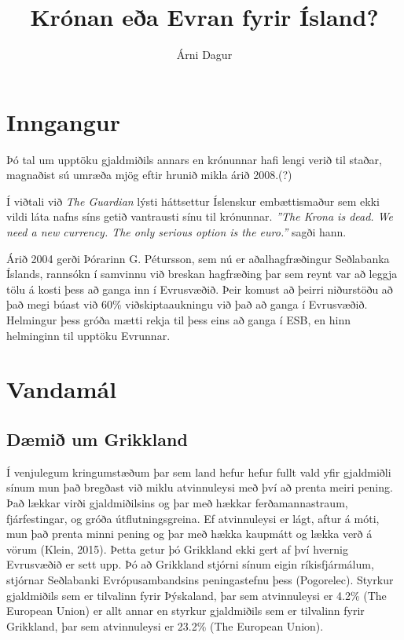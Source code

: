 \documentclass[a4paper]{article}
\title{Krónan eða Evran fyrir Ísland?}
\author{Árni Dagur}
\begin{document}
\maketitle

\section{Inngangur}

Þó tal um upptöku gjaldmiðils annars en krónunnar hafi lengi verið til staðar, magnaðist sú umræða mjög eftir hrunið mikla árið 2008.(?)

Í viðtali við \textit{The Guardian} lýsti háttsettur Íslenskur embættismaður sem ekki vildi láta nafns síns getið vantrausti sínu til krónunnar. \textit{''The Krona is dead. We need a new currency. The only serious option is the euro.''} sagði hann.\cite{traynor_2009}

Árið 2004 gerði Þórarinn G. Pétursson, sem nú er aðalhagfræðingur Seðlabanka Íslands, rannsókn í samvinnu við breskan hagfræðing þar sem reynt var að leggja tölu á kosti þess að ganga inn í Evrusvæðið. Þeir komust að þeirri niðurstöðu að það megi búast við 60\% viðskiptaaukningu við það að ganga í Evrusvæðið. Helmingur þess gróða mætti rekja til þess eins að ganga í ESB, en hinn helminginn til upptöku Evrunnar.\cite{icb_wp_26}

\section{Vandamál}

\subsection{Dæmið um Grikkland}

Í venjulegum kringumstæðum þar sem land hefur hefur fullt vald yfir gjaldmiðli sínum mun það bregðast við miklu atvinnuleysi með því að prenta meiri pening. Það lækkar virði gjaldmiðilsins og þar með hækkar ferðamannastraum, fjárfestingar, og gróða útflutningsgreina. Ef atvinnuleysi er lágt, aftur á móti, mun það prenta minni pening og þar með hækka kaupmátt og lækka verð á vörum (Klein, 2015). Þetta getur þó Grikkland ekki gert af því hvernig Evrusvæðið er sett upp. Þó að Grikkland stjórni sínum eigin ríkisfjármálum, stjórnar Seðlabanki Evrópusambandsins  peningastefnu þess (Pogorelec). Styrkur gjaldmiðils sem er tilvalinn fyrir Þýskaland, þar sem atvinnuleysi er 4.2\% (The European Union) er allt annar en styrkur gjaldmiðils sem er tilvalinn fyrir Grikkland, þar sem atvinnuleysi er 23.2\% (The European Union).



\end{document}
